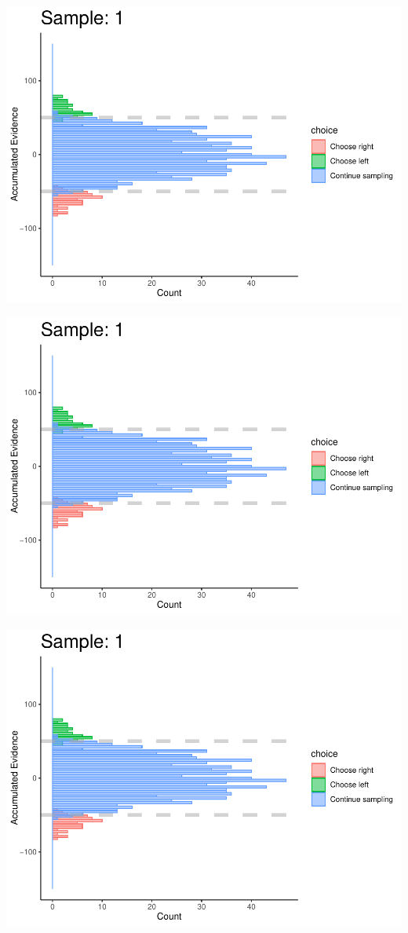 \documentclass[
]{book}
\begin{document}
\begin{center}\includegraphics[width=0.8\linewidth]{LateNightBayes_files/figure-latex/fixed_check-4} \end{center}

\begin{center}\includegraphics[width=0.8\linewidth]{LateNightBayes_files/figure-latex/fixed_check-5} \end{center}

\begin{center}\includegraphics[width=0.8\linewidth]{LateNightBayes_files/figure-latex/fixed_check-6} \end{center}
\end{document}
